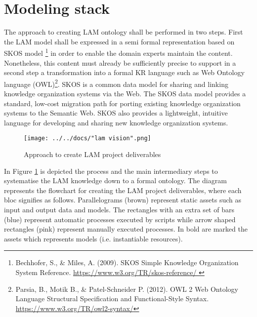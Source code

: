 
\section{Modeling stack}\label{ariaid-title134}

The approach to creating LAM ontology shall be performed in two steps.
First the LAM model shall be expressed in a semi formal representation
based on SKOS model \footnote{Bechhofer, S., \& 	Miles, A. (2009). SKOS Simple Knowledge Organization System Reference. \url{https://www.w3.org/TR/skos-reference/ }} in
order to enable the domain experts maintain the content. Nonetheless,
this content must already be sufficiently precise to support in a second
step a transformation into a formal KR language such as Web Ontology
language (OWL)\footnote{Parsia, B., Motik B.,  \& Patel-Schneider P. (2012). OWL 2 Web Ontology Language Structural Specification and Functional-Style Syntax. \url{https://www.w3.org/TR/owl2-syntax/}}. 
SKOS is a common data model for sharing and linking knowledge organization systems via the Web. The SKOS data model provides a standard, low-cost migration path for porting existing knowledge organization systems to the Semantic Web. SKOS also provides a lightweight, intuitive language for developing and sharing new knowledge organization systems.

\begin{figure}[!ht]
	\centering
	\texttt{[image: ../../docs/"lam vision".png]}
	\caption{Approach to create LAM project deliverables}
	\label{fig:process-fig}
\end{figure}


In Figure \ref{fig:process-fig} is depicted the process and the main intermediary steps
to systematise the LAM knowledge down to a formal ontology. The diagram
represents the flowchart for creating the LAM project deliverables,
where each bloc signifies as follows. Parallelograms (brown) represent
static assets such as input and output data and models. The rectangles
with an extra set of bars (blue) represent automatic processes executed
by scripts while arrow shaped rectangles (pink) represent manually
executed processes. In bold are marked the assets which represents
models (i.e. instantiable resources).



